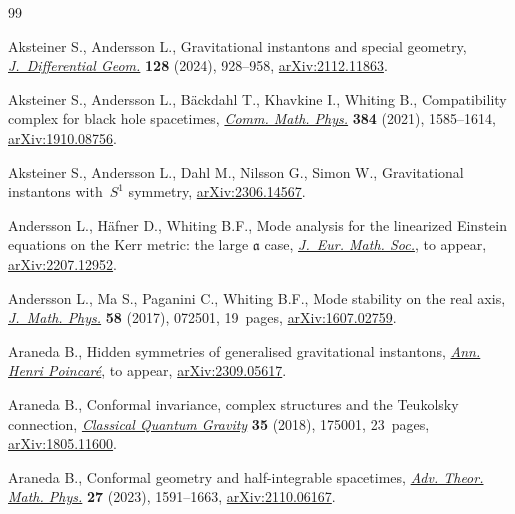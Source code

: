 \begin{thebibliography}{99}
\footnotesize\itemsep=0pt

Aksteiner S., Andersson L., Gravitational instantons and special geometry,
 \href{https://doi.org/10.4310/jdg/1729092451}{\textit{J.~Differential Geom.}} \textbf{128} (2024), 928--958,
 \href{https://arxiv.org/abs/2112.11863}{arXiv:2112.11863}.

Aksteiner S., Andersson L., B\"ackdahl T., Khavkine I., Whiting B.,
 Compatibility complex for black hole spacetimes, \href{https://doi.org/10.1007/s00220-021-04078-y}{\textit{Comm. Math. Phys.}}
 \textbf{384} (2021), 1585--1614, \href{https://arxiv.org/abs/1910.08756}{arXiv:1910.08756}.

Aksteiner S., Andersson L., Dahl M., Nilsson G., Simon W., Gravitational
 instantons with~{$S^1$} symmetry, \href{https://arxiv.org/abs/2306.14567}{arXiv:2306.14567}.

Andersson L., H\"afner D., Whiting B.F., Mode analysis for the linearized
 {E}instein equations on the {K}err metric: the large $\mathfrak{a}$ case,
 \href{https://doi.org/10.4171/JEMS/1544}{\textit{J.~Eur. Math. Soc.}}, {t}o appear, \href{https://arxiv.org/abs/2207.12952}{arXiv:2207.12952}.

Andersson L., Ma S., Paganini C., Whiting B.F., Mode stability on the real
 axis, \href{https://doi.org/10.1063/1.4991656}{\textit{J.~Math. Phys.}} \textbf{58} (2017), 072501, 19~pages,
 \href{https://arxiv.org/abs/1607.02759}{arXiv:1607.02759}.

Araneda B., Hidden symmetries of generalised gravitational instantons,
 \href{https://doi.org/10.1007/s00023-024-01515-1}{\textit{Ann. Henri Poincar\'e}}, {t}o appear, \href{https://arxiv.org/abs/2309.05617}{arXiv:2309.05617}.

Araneda B., Conformal invariance, complex structures and the {T}eukolsky
 connection, \href{https://doi.org/10.1088/1361-6382/aad13b}{\textit{Classical Quantum Gravity}} \textbf{35} (2018), 175001,
 23~pages, \href{https://arxiv.org/abs/1805.11600}{arXiv:1805.11600}.

Araneda B., Conformal geometry and half-integrable spacetimes, \href{https://doi.org/10.4310/atmp.2023.v27.n6.a1}{\textit{Adv.
 Theor. Math. Phys.}} \textbf{27} (2023), 1591--1663, \href{https://arxiv.org/abs/2110.06167}{arXiv:2110.06167}.


\end{thebibliography}
